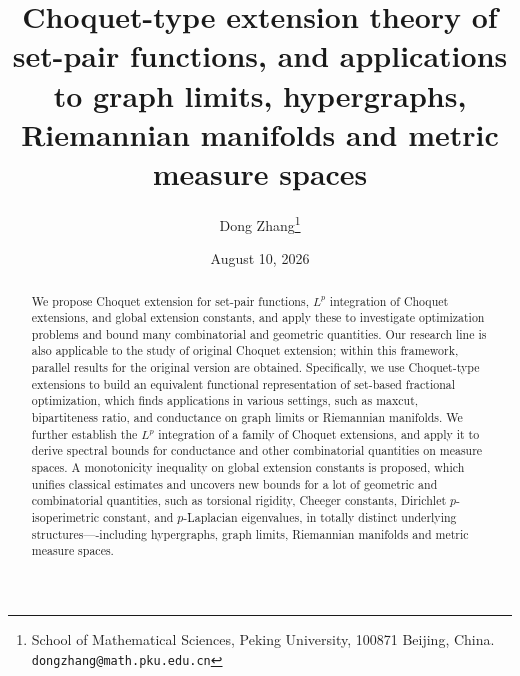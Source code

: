 \documentclass[12pt,a4paper]{article}
\begin{document}
\def\QR{{R^{cc}}}

\def\url{}
\title{Choquet-type extension theory of set-pair functions, and applications to graph limits, hypergraphs, Riemannian manifolds and metric measure spaces}
\author{Dong Zhang\thanks{School of Mathematical Sciences,  Peking University,   100871 Beijing, China. {\tt dongzhang@math.pku.edu.cn}}}
\date{August 10, 2026}
\maketitle


\allowdisplaybreaks[4]



\vspace{0.2cm}

\normalsize

%

\begin{abstract}
We propose Choquet extension for set-pair functions, $L^p$ integration of Choquet extensions, and global extension constants, and apply these to investigate optimization problems and bound many combinatorial and geometric quantities. 
Our research line is also applicable to the study of original Choquet extension; within this framework, parallel results for the original version are obtained. 
Specifically, we use Choquet-type extensions to build an equivalent functional representation of set-based fractional optimization, which finds applications in various settings, such as  maxcut, bipartiteness ratio, and conductance on graph limits or Riemannian manifolds. 
We further establish the $L^p$ integration of a family of Choquet extensions, and apply it to derive spectral bounds for conductance and other combinatorial quantities on measure spaces.  
A monotonicity inequality on global extension constants is proposed, which unifies classical estimates and uncovers new bounds for a lot of geometric and combinatorial quantities, such as torsional rigidity,  Cheeger constants, Dirichlet $p$-isoperimetric constant, and $p$-Laplacian eigenvalues, in totally distinct underlying structures----including  hypergraphs, graph limits, Riemannian manifolds and metric measure spaces. 
\end{abstract}

\tableofcontents

\vspace{0.3cm}
\end{document}
